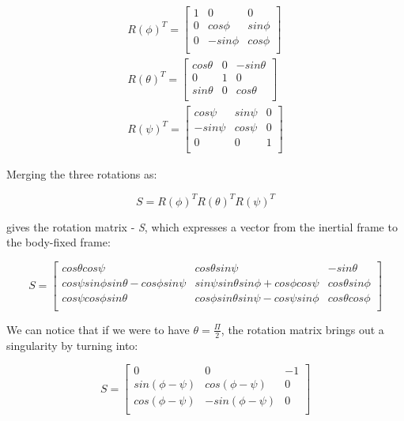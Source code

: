 \begin{equation}
\label{rollpitchyaweq}
\begin{aligned}
 	R(\phi)^{T}=\begin{bmatrix}
 	1 & 0 & 0 \\
 	0 & cos\phi & sin\phi \\
 	0 & -sin\phi & cos\phi \\
 	\end{bmatrix}\\     R(\theta)^{T}=\begin{bmatrix}
 	cos\theta & 0 & -sin\theta \\
 	0 & 1 & 0 \\
 	sin\theta & 0 & cos\theta \\
 	\end{bmatrix}\\     R(\psi)^{T}=\begin{bmatrix}
 	cos\psi & sin\psi & 0 \\
 	-sin\psi & cos\psi & 0 \\
 	0 & 0 & 1 \\
 	\end{bmatrix}
\end{aligned}
\end{equation}
 
Merging the three rotations as: 

\begin{equation}
\label{S1}	
 	S=R(\phi)^{T}R(\theta)^{T}R(\psi)^{T}
\end{equation}
 
gives the rotation matrix - \textit{S}, which expresses a vector from the inertial frame to the body-fixed frame: 
 
\begin{equation}
\label{S2}
 S=\begin{bmatrix}
 	cos\theta cos\psi & cos\theta sin\psi & -sin\theta \\
 	cos\psi sin\phi sin\theta-cos\phi sin\psi & sin\psi sin\theta sin\phi+cos\phi cos\psi & cos\theta sin\phi \\
 	cos\psi cos\phi sin\theta & cos\phi sin\theta sin\psi-cos\psi sin\phi & cos\theta cos\phi \\
\end{bmatrix}
\end{equation}
 	 
We can notice that if we were to have $\theta=\frac{\Pi}{2}$, the rotation matrix brings out a singularity by turning into:

\begin{equation}
\label{S3}
 S=\begin{bmatrix}
 	0 & 0 & -1 \\
 	sin(\phi-\psi) & cos(\phi-\psi) & 0 \\
 	cos(\phi-\psi) & -sin(\phi-\psi) & 0 \\
\end{bmatrix}
\end{equation}
 	 
